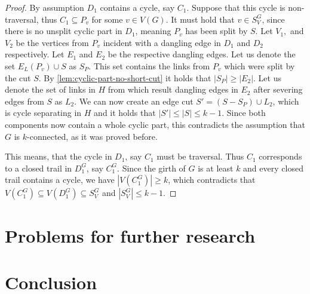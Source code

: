 \documentclass[12pt, twoside]{book}
\begin{document}
\begin{proof}
	By assumption $D_1$ contains a cycle, say $C_1$. Suppose that this cycle is non-traversal, thus $C_1\subseteq P_v$ for some $v\in V(G)$. It must hold that $v\in S_V^G$, since there is no unsplit cyclic part in $D_1$, meaning $P_v$ has been split by $S$. Let $V_1,$ and $V_2$ be the vertices from $P_v$ incident with a dangling edge in $D_1$ and $D_2$ respectively. Let $E_1$ and $E_2$ be the respective dangling edges. Let us denote the set $E_L(P_v)\cup S$ as $S_P$. This set contains the links from $P_v$ which were split by the cut $S$. By \cref{lem:cyclic-part-no-short-cut} it holds that $|S_P|\geq|E_2|$. Let us denote the set of links in $H$ from which result dangling edges in $E_2$ after severing edges from $S$ as $L_2$. We can now create an edge cut $S'=(S-S_P)\cup L_2$, which is cycle separating in $H$ and it holds that $|S'|\leq |S|\leq k-1$. Since both components now contain a whole cyclic part, this contradicts the assumption that $G$ is $k$-connected, as it was proved before.
	
	This means, that the cycle in $D_1$, say $C_1$ must be traversal. Thus $C_1$ corresponds to a closed trail in $D_1^G$, say $C_1^G$. Since the girth of $G$ is at least $k$ and every closed trail contains a cycle, we have $|V(C_1^G)|\geq k$, which contradicts that $V(C_1^G)\subseteq V(D_1^G)\subseteq S_V^G$ and $|S_V^G|\leq k-1$.
	
\end{proof}

\chapter{Problems for further research}

\todo{}

\chapter*{Conclusion}

\newpage
\thispagestyle{empty}




\end{document}
